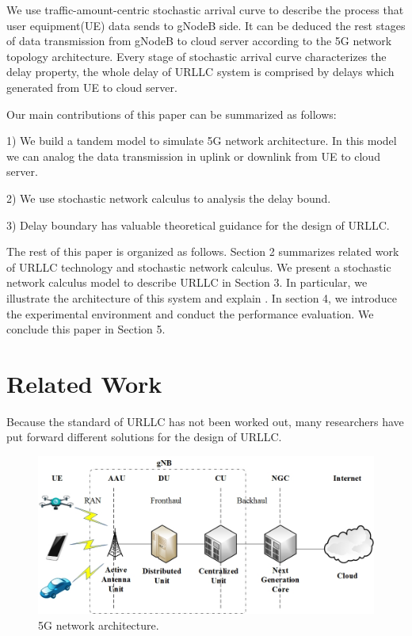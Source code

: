 \documentclass[conference]{IEEEtran}
\begin{document}
We use traffic-amount-centric stochastic arrival curve to describe the process that user equipment(UE) data sends to gNodeB side. It can be deduced the rest stages of data transmission from gNodeB to cloud server according to the 5G network topology architecture. Every stage of stochastic arrival curve characterizes the delay property, the whole delay of URLLC system is comprised by delays which generated from UE to cloud server.

Our main contributions of this paper can be summarized as follows:

1) We build a tandem model to simulate 5G network architecture. In this model we can analog the data transmission in uplink or downlink from UE to cloud server.

2) We use stochastic network calculus to analysis the delay bound.

3) Delay boundary has valuable theoretical guidance for the design of URLLC.

The rest of this paper is organized as follows. Section 2 summarizes related work of URLLC technology and stochastic network calculus. We present a stochastic network calculus model to describe URLLC  in Section 3. In particular, we illustrate the architecture of this system and explain . In section 4, we introduce the experimental environment and conduct the performance evaluation. We conclude this paper in Section 5.

\section{Related Work}

Because the standard of URLLC has not been worked out, many researchers have put forward different solutions for the design of URLLC.
\begin{figure}[htbp]
\centering
\includegraphics[width=.5\textwidth]{5G_delay_en.jpg}
\caption{5G network architecture.}
\label{fig_architecture}
\end{figure}
\end{document}
